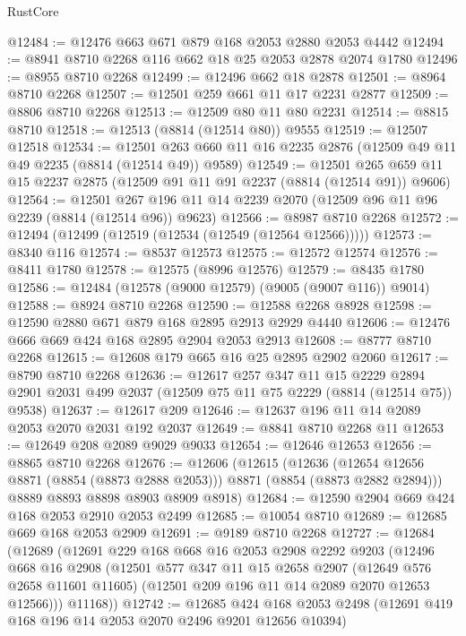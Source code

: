 \begin{lexlean}{RustCore}
\begin{coremodule}
@12484 := @12476 @663 @671 @879 @168 @2053 @2880 @2053 @4442
@12494 := @8941 @8710 @2268 @116 @662 @18 @25 @2053 @2878 @2074 @1780
@12496 := @8955 @8710 @2268
@12499 := @12496 @662 @18 @2878
@12501 := @8964 @8710 @2268
@12507 := @12501 @259 @661 @11 @17 @2231 @2877
@12509 := @8806 @8710 @2268
@12513 := @12509 @80 @11 @80 @2231
@12514 := @8815 @8710
@12518 := @12513 (@8814 (@12514 @80)) @9555
@12519 := @12507 @12518
@12534 := @12501 @263 @660 @11 @16 @2235 @2876 (@12509 @49 @11 @49 @2235 (@8814 (@12514 @49)) @9589)
@12549 := @12501 @265 @659 @11 @15 @2237 @2875 (@12509 @91 @11 @91 @2237 (@8814 (@12514 @91)) @9606)
@12564 := @12501 @267 @196 @11 @14 @2239 @2070 (@12509 @96 @11 @96 @2239 (@8814 (@12514 @96)) @9623)
@12566 := @8987 @8710 @2268
@12572 := @12494 (@12499 (@12519 (@12534 (@12549 (@12564 @12566)))))
@12573 := @8340 @116
@12574 := @8537 @12573
@12575 := @12572 @12574
@12576 := @8411 @1780
@12578 := @12575 (@8996 @12576)
@12579 := @8435 @1780
@12586 := @12484 (@12578 (@9000 @12579) (@9005 (@9007 @116)) @9014)
@12588 := @8924 @8710 @2268
@12590 := @12588 @2268 @8928
@12598 := @12590 @2880 @671 @879 @168 @2895 @2913 @2929 @4440
@12606 := @12476 @666 @669 @424 @168 @2895 @2904 @2053 @2913
@12608 := @8777 @8710 @2268
@12615 := @12608 @179 @665 @16 @25 @2895 @2902 @2060
@12617 := @8790 @8710 @2268
@12636 := @12617
    @257
    @347
    @11
    @15
    @2229
    @2894
    @2901
    @2031
    @499
    @2037
    (@12509 @75 @11 @75 @2229 (@8814 (@12514 @75)) @9538)
@12637 := @12617 @209
@12646 := @12637 @196 @11 @14 @2089 @2053 @2070 @2031 @192 @2037
@12649 := @8841 @8710 @2268 @11
@12653 := @12649 @208 @2089 @9029 @9033
@12654 := @12646 @12653
@12656 := @8865 @8710 @2268
@12676 := @12606
    (@12615
      (@12636 (@12654 @12656 @8871 (@8854 (@8873 @2888 @2053))) @8871 (@8854 (@8873 @2882 @2894)))
      @8889
      @8893
      @8898
      @8903
      @8909
      @8918)
@12684 := @12590 @2904 @669 @424 @168 @2053 @2910 @2053 @2499
@12685 := @10054 @8710
@12689 := @12685 @669 @168 @2053 @2909
@12691 := @9189 @8710 @2268
@12727 := @12684
    (@12689
      (@12691
        @229
        @168
        @668
        @16
        @2053
        @2908
        @2292
        @9203
        (@12496
          @668
          @16
          @2908
          (@12501
            @577
            @347
            @11
            @15
            @2658
            @2907
            (@12649 @576 @2658 @11601 @11605)
            (@12501 @209 @196 @11 @14 @2089 @2070 @12653 @12566)))
        @11168))
@12742 := @12685
    @424
    @168
    @2053
    @2498
    (@12691 @419 @168 @196 @14 @2053 @2070 @2496 @9201 @12656 @10394)

\end{coremodule}
\end{lexlean}
